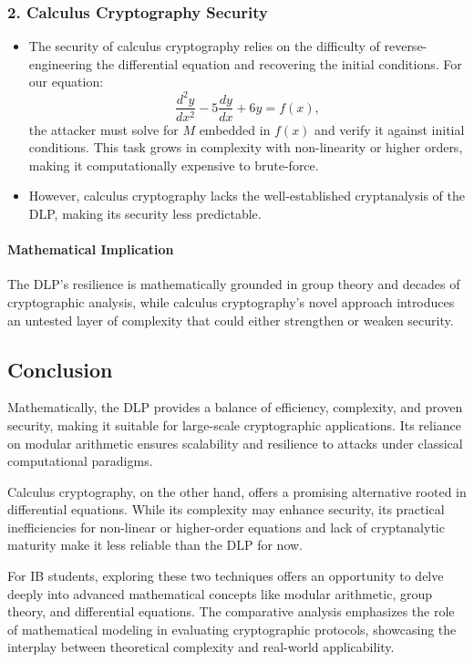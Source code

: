 \documentclass[12pt]{article}
\begin{document}
\subsubsection*{2. Calculus Cryptography Security}
\begin{itemize}
    \item The security of calculus cryptography relies on the difficulty of reverse-engineering the differential equation and recovering the initial conditions. For our equation:
    \[
    \frac{d^2y}{dx^2} - 5\frac{dy}{dx} + 6y = f(x),
    \]
    the attacker must solve for \( M \) embedded in \( f(x) \) and verify it against initial conditions. This task grows in complexity with non-linearity or higher orders, making it computationally expensive to brute-force.
    \item However, calculus cryptography lacks the well-established cryptanalysis of the DLP, making its security less predictable.
\end{itemize}

\paragraph*{Mathematical Implication}
The DLP’s resilience is mathematically grounded in group theory and decades of cryptographic analysis, while calculus cryptography’s novel approach introduces an untested layer of complexity that could either strengthen or weaken security.

\subsection*{Conclusion}

Mathematically, the DLP provides a balance of efficiency, complexity, and proven security, making it suitable for large-scale cryptographic applications. Its reliance on modular arithmetic ensures scalability and resilience to attacks under classical computational paradigms.

Calculus cryptography, on the other hand, offers a promising alternative rooted in differential equations. While its complexity may enhance security, its practical inefficiencies for non-linear or higher-order equations and lack of cryptanalytic maturity make it less reliable than the DLP for now.

For IB students, exploring these two techniques offers an opportunity to delve deeply into advanced mathematical concepts like modular arithmetic, group theory, and differential equations. The comparative analysis emphasizes the role of mathematical modeling in evaluating cryptographic protocols, showcasing the interplay between theoretical complexity and real-world applicability.
\end{document}
